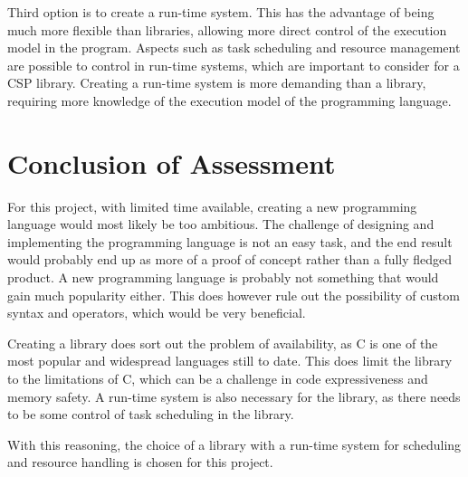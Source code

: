 Third option is to create a run\hyp{}time system. This has the advantage of being much more flexible than libraries, allowing more direct control of the execution model in the program. Aspects such as task scheduling and resource management are possible to control in run\hyp{}time systems, which are important to consider for a CSP library. Creating a run-time system is more demanding than a library, requiring more knowledge of the execution model of the programming language.


\section{Conclusion of Assessment}

For this project, with limited time available, creating a new programming language would most likely be too ambitious. The challenge of designing and implementing the programming language is not an easy task, and the end result would probably end up as more of a proof of concept rather than a fully fledged product. A new programming language is probably not something that would gain much popularity either. This does however rule out the possibility of custom syntax and operators, which would be very beneficial. 

Creating a library does sort out the problem of availability, as C is one of the most popular and widespread languages still to date. This does limit the library to the limitations of C, which can be a challenge in code expressiveness and memory safety. A run\hyp{}time system is also necessary for the library, as there needs to be some control of task scheduling in the library. 

With this reasoning, the choice of a library with a run\hyp{}time system for scheduling and resource handling is chosen for this project.


